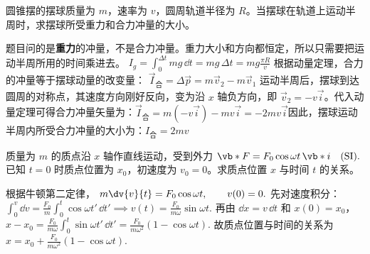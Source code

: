 \begin{exercise}
圆锥摆的摆球质量为 \(m\)，速率为 \(v\)，圆周轨道半径为 \(R\)。当摆球在轨道上运动半周时，求摆球所受重力和合力冲量的大小。
\end{exercise}
\begin{solution}
题目问的是\textbf{重力}的冲量，不是合力冲量。重力大小和方向都恒定，所以只需要把运动半周所用的时间乘进去。
 \(I_g=\int_0^{\Delta t} mg\,\dd t=mg\,\Delta t=mg\frac{\pi R}{v}\) 根据动量定理，合力的冲量等于摆球动量的改变量： \(\vec{I}_{\text{合}} = \Delta \vec{p} = m\vec{v}_2 - m\vec{v}_1\) 运动半周后，摆球到达圆周的对称点，其速度方向刚好反向，变为沿 $x$ 轴负方向，即 $\vec{v}_2 = -v\vec{i}$。代入动量定理可得合力冲量矢量为：$\vec{I}_{\text{合}} = m(-v\vec{i}) - mv\vec{i} = -2mv\vec{i}$因此，摆球运动半周内所受合力冲量的大小为：$I_{\text{合}} = 2mv$
\end{solution}


\begin{exercise}
质量为 \(m\) 的质点沿 \(x\) 轴作直线运动，受到外力
 \(\vb*{F}=F_0\cos\omega t\,\vb*{i}\quad(\mathrm{SI}).\) 
已知 \(t=0\) 时质点位置为 \(x_0\)，初速度为 \(v_0=0\)。求质点位置 \(x\) 与时间 \(t\) 的关系。
\end{exercise}
\begin{solution}
根据牛顿第二定律，
 \(m\dv{v}{t}=F_0\cos\omega t,\qquad v(0)=0.\) 
先对速度积分：
 \(\int_0^v \dd v =\frac{F_0}{m}\int_0^t \cos\omega t'\,\dd t' \implies v(t)=\frac{F_0}{m\omega}\sin\omega t.\) 
再由 \(\dd x=v\,\dd t\) 和 \(x(0)=x_0\)，
 \(x-x_0 =\frac{F_0}{m\omega}\int_0^t \sin\omega t'\,\dd t' =\frac{F_0}{m\omega^2}(1-\cos\omega t).\) 
故质点位置与时间的关系为
 \(x=x_0+\frac{F_0}{m\omega^2}(1-\cos\omega t).\) 
\end{solution}
